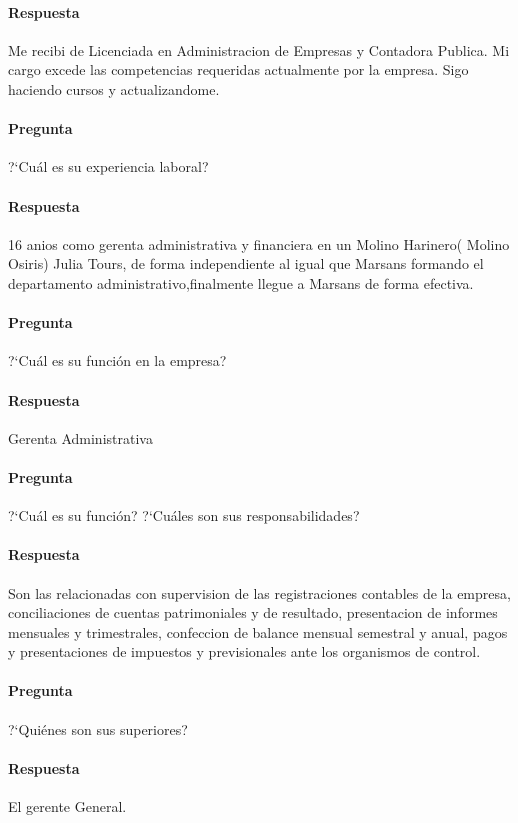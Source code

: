 \documentclass[12pt,a4paper,spanish]{article}
\begin{document}
	\paragraph{Respuesta}
Me recibi de Licenciada en Administracion de Empresas y Contadora Publica.
Mi cargo excede las competencias requeridas actualmente por la empresa.
Sigo haciendo cursos y actualizandome.

	\paragraph{Pregunta}
	 ?`Cu\'al es su experiencia laboral?
	\paragraph{Respuesta}
16 anios como gerenta administrativa y financiera en un Molino Harinero( Molino Osiris)
Julia Tours, de forma independiente al igual que Marsans formando el departamento administrativo,finalmente llegue a Marsans de forma efectiva.

	\paragraph{Pregunta}
	 ?`Cu\'al es su funci\'on en la empresa?
	\paragraph{Respuesta}
	 Gerenta Administrativa

	\paragraph{Pregunta}
	 ?`Cu\'al es su funci\'on?  ?`Cu\'ales son sus responsabilidades?
	\paragraph{Respuesta}
	Son las relacionadas con supervision de las registraciones contables de la empresa, conciliaciones de cuentas patrimoniales y de resultado, presentacion de informes mensuales y trimestrales, confeccion de balance mensual semestral y anual, pagos y presentaciones de impuestos y previsionales ante los organismos de control.

	\paragraph{Pregunta}
	 ?`Qui\'enes son sus superiores? 
	\paragraph{Respuesta}
El gerente General.
\end{document}
